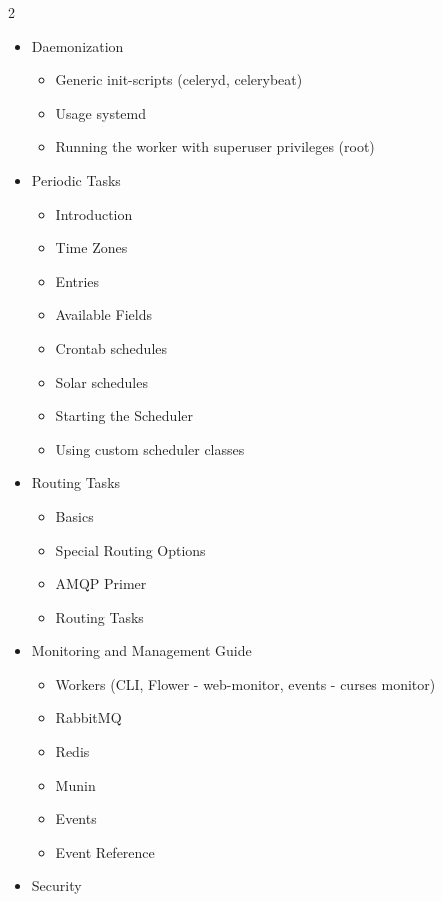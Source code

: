 \documentclass [8pt] {extarticle}
\begin{document}
\begin {multicols} {2}
\begin {itemize}
\begin {itemize}
\item Daemonization

    \begin {itemize}
        \item Generic init-scripts (celeryd, celerybeat)
        \item Usage systemd
        \item Running the worker with superuser privileges (root)
    \end {itemize}

\item Periodic Tasks

    \begin {itemize}
\item Introduction
\item Time Zones
\item Entries
\item \quad    Available Fields
\item Crontab schedules
\item Solar schedules
\item Starting the Scheduler
\item \quad   Using custom scheduler classes
    \end {itemize}

\item Routing Tasks

    \begin {itemize}
        \item Basics
        \item Special Routing Options
        \item AMQP Primer
        \item Routing Tasks
    \end {itemize}

\item Monitoring and Management Guide

    \begin {itemize}
\item Workers (CLI, Flower - web-monitor, events - curses monitor)
\item RabbitMQ
\item Redis
\item Munin
\item Events
\item Event Reference
    \end {itemize}

\item Security


\end{itemize}
\end{itemize}
\end{multicols}
\end{document}
